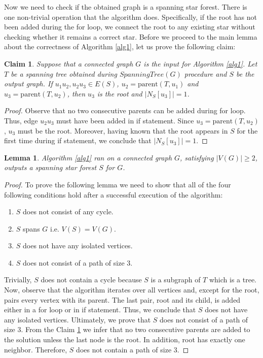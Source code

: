 \documentclass[en]{pracamgr}
\newtheorem{lemma}{Lemma}
\newtheorem{claim}{Claim}
\begin{document}
Now we need to check if the obtained graph is a spanning star forest. There is one non-trivial operation that the algorithm does. Specifically, if the root has not  been added during the for loop, we connect the root to any existing star without checking whether it remains a correct star. Before we proceed to the main lemma about the correctness of Algorithm \ref{alg1}, let us prove the following claim:

\begin{claim}\label{ssf root}
	Suppose that a connected graph $G$ is the input for Algorithm \ref{alg1}. Let $T$ be a spanning tree obtained during $SpanningTree(G)$ procedure and $S$ be the output graph. If $u_1 u_2,u_2 u_3 \in E(S)$, $u_2 = \textrm{parent}(T,u_1)$ and $u_3=\textrm{parent}(T,u_2)$, then $u_3$ is the root and $|N_S[u_3]|=1$.
\end{claim}

\begin{proof}
	Observe that no two consecutive parents can be added during for loop. Thus, edge $u_2 u_3$ must have been added in if statement. Since $u_3 = \textrm{parent}(T,u_2)$, $u_3$ must be the root. Moreover, having known that the root appears in $S$ for the first time during if statement, we conclude that $|N_S[u_3]|=1$. 
\end{proof}

\begin{lemma}\label{alg1 correctness}
	Algorithm \ref{alg1} ran on a connected graph $G$, satisfying $|V(G)| \geq 2$, outputs a spanning star forest $S$ for $G$.
\end{lemma}

\begin{proof}
	To prove the following lemma we need to show that all of the four following conditions hold after a successful execution of the algorithm:
	\begin{enumerate}
		\item $S$ does not consist of any cycle.
		\item $S$ spans $G$ i.e. $V(S) = V(G)$.
		\item $S$ does not have any isolated vertices.
		\item $S$ does not consist of a path of size $3$.
	\end{enumerate}
	Trivially, $S$ does not contain a cycle because $S$ is a subgraph of $T$ which is a tree. Now, observe that the algorithm iterates over all vertices and, except for the root, pairs every vertex with its parent. The last pair, root and its child, is added either in a for loop or in if statement. Thus, we conclude that $S$ does not have any isolated vertices. Ultimately, we prove that $S$ does not consist of a path of size $3$. From the Claim \ref{ssf root} we infer that no two consecutive parents are added to the solution unless the last node is the root. In addition, root has exactly one neighbor. Therefore, $S$ does not contain a path of size $3$.
\end{proof}
\end{document}
